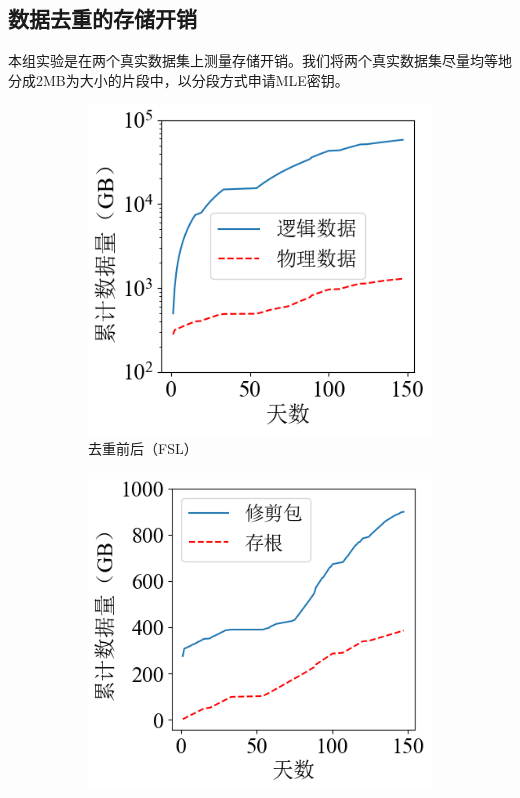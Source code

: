 \documentclass[promaster]{thesis-uestc}
\begin{document}
\subsection{数据去重的存储开销}\label{存储开销实验}
本组实验是在两个真实数据集上测量存储开销。我们将两个真实数据集尽量均等地分成2MB为大小的片段中，以分段方式申请MLE密钥。
\begin{figure}
    \centering
    \begin{subfigure}{0.40\textwidth}
        \includegraphics[width=1\linewidth]{pic/fsl_overhead.png}
        \centering
        \captionsetup{width=\textwidth}
        \caption{去重前后（FSL）}
        \label{存储开销1}
    \end{subfigure}
    \begin{subfigure}{0.40\textwidth}
        \includegraphics[width=1\linewidth]{pic/fsl_phy_stub.png}

\end{subfigure}
\end{figure}
\end{document}
